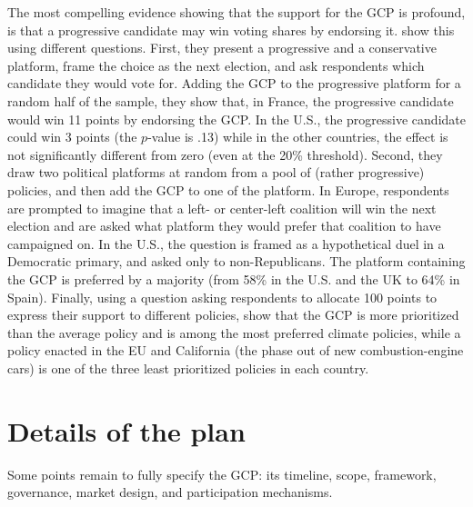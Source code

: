 \documentclass[12pt,english]{article}
\begin{document}
The most compelling evidence showing that the support for the GCP is profound, is that a progressive candidate may win voting shares by endorsing it. \citet{fabre_international_2023} show this using different questions. First, they present a progressive and a conservative platform, frame the choice as the next election, and ask respondents which candidate they would vote for. Adding the GCP to the progressive platform for a random half of the sample, they show that, in France, the progressive candidate would win 11 points by endorsing the GCP. In the U.S., the progressive candidate could win 3 points (the $p$-value is .13) while in the other countries, the effect is not significantly different from zero (even at the 20\% threshold). Second, they draw two political platforms at random from a pool of (rather progressive) policies, and then add the GCP to one of the platform. In Europe, respondents are prompted to imagine that a left- or center-left coalition will win the next election and are asked what platform they would prefer that coalition to have campaigned on. In the U.S., the question is framed as a hypothetical duel in a Democratic primary, and asked only to non-Republicans. The platform containing the GCP is preferred by a majority (from 58\% in the U.S. and the UK to 64\% in Spain). Finally, using a question asking respondents to allocate 100 points to express their support to different policies, \citet{fabre_international_2023} show that the GCP is more prioritized than the average policy and is among the most preferred climate policies, while a policy enacted in the EU and California (the phase out of new combustion-engine cars) is one of the three least prioritized policies in each country. 


\section{Details of the plan}\label{sec:details}

Some points remain to fully specify the GCP: its timeline, scope, framework, governance, market design, and participation mechanisms. 
\end{document}
